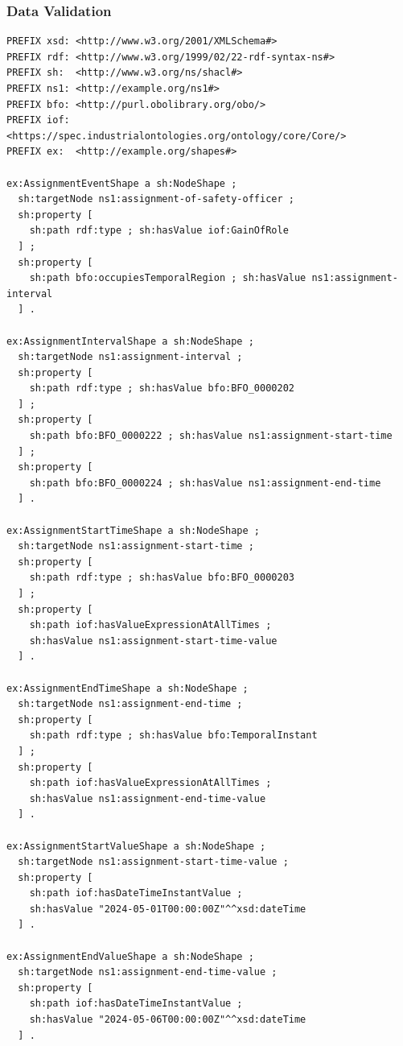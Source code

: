 \subsubsection*{Data Validation}

\begin{verbatim}
PREFIX xsd: <http://www.w3.org/2001/XMLSchema#>
PREFIX rdf: <http://www.w3.org/1999/02/22-rdf-syntax-ns#>
PREFIX sh:  <http://www.w3.org/ns/shacl#>
PREFIX ns1: <http://example.org/ns1#>
PREFIX bfo: <http://purl.obolibrary.org/obo/> 
PREFIX iof: <https://spec.industrialontologies.org/ontology/core/Core/>
PREFIX ex:  <http://example.org/shapes#>

ex:AssignmentEventShape a sh:NodeShape ;
  sh:targetNode ns1:assignment-of-safety-officer ;
  sh:property [
    sh:path rdf:type ; sh:hasValue iof:GainOfRole
  ] ;
  sh:property [
    sh:path bfo:occupiesTemporalRegion ; sh:hasValue ns1:assignment-interval
  ] .

ex:AssignmentIntervalShape a sh:NodeShape ;
  sh:targetNode ns1:assignment-interval ;
  sh:property [
    sh:path rdf:type ; sh:hasValue bfo:BFO_0000202
  ] ;
  sh:property [
    sh:path bfo:BFO_0000222 ; sh:hasValue ns1:assignment-start-time
  ] ;
  sh:property [
    sh:path bfo:BFO_0000224 ; sh:hasValue ns1:assignment-end-time
  ] .

ex:AssignmentStartTimeShape a sh:NodeShape ;
  sh:targetNode ns1:assignment-start-time ;
  sh:property [
    sh:path rdf:type ; sh:hasValue bfo:BFO_0000203
  ] ;
  sh:property [
    sh:path iof:hasValueExpressionAtAllTimes ;
    sh:hasValue ns1:assignment-start-time-value
  ] .

ex:AssignmentEndTimeShape a sh:NodeShape ;
  sh:targetNode ns1:assignment-end-time ;
  sh:property [
    sh:path rdf:type ; sh:hasValue bfo:TemporalInstant
  ] ;
  sh:property [
    sh:path iof:hasValueExpressionAtAllTimes ;
    sh:hasValue ns1:assignment-end-time-value
  ] .

ex:AssignmentStartValueShape a sh:NodeShape ;
  sh:targetNode ns1:assignment-start-time-value ;
  sh:property [
    sh:path iof:hasDateTimeInstantValue ;
    sh:hasValue "2024-05-01T00:00:00Z"^^xsd:dateTime
  ] .

ex:AssignmentEndValueShape a sh:NodeShape ;
  sh:targetNode ns1:assignment-end-time-value ;
  sh:property [
    sh:path iof:hasDateTimeInstantValue ;
    sh:hasValue "2024-05-06T00:00:00Z"^^xsd:dateTime
  ] .
\end{verbatim}